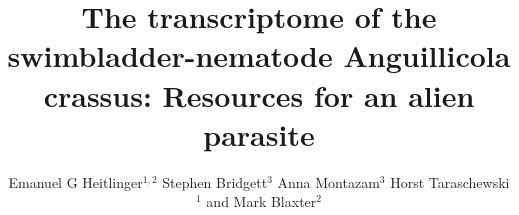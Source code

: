 \documentclass[10pt]{bmc_article}
\newenvironment{bmcformat}{\begin{raggedright}\baselineskip20pt\sloppy\setboolean{publ}{false}}{\end{raggedright}\baselineskip20pt\sloppy}
\begin{document}
\begin{bmcformat}



  \title{The transcriptome of the swimbladder-nematode
    Anguillicola crassus: Resources for an alien parasite}
 


\author{Emanuel G Heitlinger\correspondingauthor$^{1,2}$%
       Stephen Bridgett$^{3}$%
       Anna Montazam$^{3}$%
       Horst Taraschewski$^1$%
       and Mark Blaxter$^2$%
     }%
      


      \address{%
        \iid(1)Department of Ecology and Parasitology, Zoological
        Institute 1, University of Karlsruhe,%
        Kornblumenstrasse 13, Karlsruhe, Germany\\
        \iid(2)Institute of Evolutionary Biology, The Ashworth laboratories, The University of Edinburgh, King's Buildings Campus, Edinburgh, UK
        \iid(3)The GenePool Sequencing Service, The Ashworth laboratories, The University of Edinburgh, King's Buildings Campus, Edinburgh, UK
      }%

\maketitle


\end{bmcformat}
\end{document}
